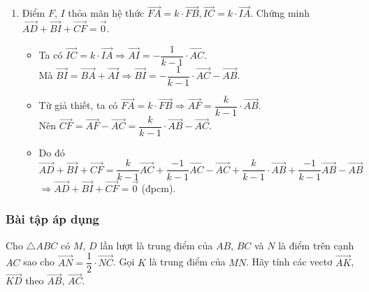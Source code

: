 \begin{vd}
{\begin{enumerate}
\begin{itemize}
				      \item Tính $\overrightarrow{DE}$ theo $\overrightarrow{AB}$, $\overrightarrow{AC}$.\\
				            Ta có $\overrightarrow{DE}=\overrightarrow{AE}-\overrightarrow{AD}$. \qquad $(3)$\\
				            Thay $(1)$, $(2)$ vào $(3)$ và rút gọn, ta được $\overrightarrow{DE}=\dfrac{k+1}{k-1}\left(\overrightarrow{AB}-\overrightarrow{AC}\right)$.
			      \end{itemize}
			\item Điểm $F$, $I$ thỏa mãn hệ thức $\overrightarrow{FA}=k\cdot \overrightarrow{FB},\overrightarrow{IC}=k\cdot \overrightarrow{IA}$. Chứng minh $\overrightarrow{AD}+\overrightarrow{BI}+\overrightarrow{CF}=\overrightarrow{0}$.
			      \begin{itemize}
				      \item Ta có $\overrightarrow{IC}=k\cdot \overrightarrow{IA}\Rightarrow \overrightarrow{AI}=-\dfrac{1}{k-1}\cdot \overrightarrow{AC}$.\\
				            Mà $\overrightarrow{BI}=\overrightarrow{BA}+\overrightarrow{AI}\Rightarrow \overrightarrow{BI}=-\dfrac{1}{k-1}\cdot \overrightarrow{AC}-\overrightarrow{AB}$.
				      \item Từ giả thiết, ta có $\overrightarrow{FA}=k\cdot \overrightarrow{FB}\Rightarrow \overrightarrow{AF}=\dfrac{k}{k-1}\cdot \overrightarrow{AB}$.\\
				            Nên  $\overrightarrow{CF}=\overrightarrow{AF}-\overrightarrow{AC}=\dfrac{k}{k-1}\cdot \overrightarrow{AB}-\overrightarrow{AC}$.
				      \item Do đó $\overrightarrow{AD}+\overrightarrow{BI}+\overrightarrow{CF}=\dfrac{k}{k-1}\overrightarrow{AC}+\dfrac{-1}{k-1}\overrightarrow{AC}-\overrightarrow{AC}+\dfrac{k}{k-1}\cdot \overrightarrow{AB}+\dfrac{-1}{k-1}\overrightarrow{AB}-\overrightarrow{AB}$\\
				            $\Rightarrow \overrightarrow{AD}+\overrightarrow{BI}+\overrightarrow{CF}=\overrightarrow{0}$ (đpcm).
			      \end{itemize}
		\end{enumerate}
	}
\end{vd}
\subsubsection{Bài tập áp dụng}
\begin{bt}%
	Cho $\triangle ABC$ có $M$, $D$ lần lượt là trung điểm của $AB$, $BC$ và $N$ là điểm trên cạnh $AC$ sao cho $\overrightarrow{AN}=\dfrac{1}{2}\cdot \overrightarrow{NC}$. Gọi $K$ là trung điểm của $MN$. Hãy tính các vectơ $\overrightarrow{AK}$, $\overrightarrow{KD}$ theo $\overrightarrow{AB}$, $\overrightarrow{AC}$.
\end{bt}


